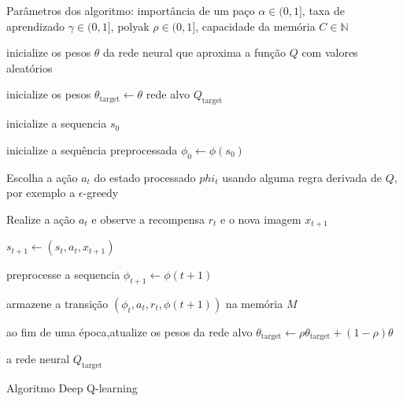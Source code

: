 \begin{algorithm}[H]
    Parâmetros dos algoritmo:
    importância de um paço $\alpha \in (0,1]$,
    taxa de aprendizado $\gamma \in (0,1]$,
    polyak $\rho \in (0,1]$,
    capacidade da memória $C \in \mathbb{N}$ 


    inicialize os pesos $\theta$ da rede neural que aproxima a função $Q$ com valores aleatórios

    inicialize os pesos $\theta_{\text{target}}  \leftarrow \theta$ rede alvo $Q_{\text{target}}$

     {
        inicialize a sequencia $s_0$

        inicialize a sequência preprocessada $\phi_0 \leftarrow \phi(s_0)$ 
        

         {
            Escolha a ação $a_t$ do estado processado $phi_t$ usando alguma regra derivada de $Q$,
            por exemplo a $\epsilon$-greedy

            Realize a ação $a_t$ e observe a recompensa $r_t$ e o nova imagem $x_{t+1}$
            
            $s_{t+1}  \leftarrow (s_t, a_t, x_{t+1})$   

            preprocesse a sequencia $\phi_{t+1} \leftarrow \phi(t+1)$
            
            armazene a transição $(\phi_t,a_t,r_t,\phi(t+1))$ na memória $M$



        }

        ao fim de uma época,atualize os pesos da rede alvo
        $\theta_{\text{target}}  \leftarrow \rho \theta_{\text{target}}  + (1-\rho) \theta$
        
    }
    \Retorna a rede neural $Q_{\text{target}}$
    \caption{Algoritmo Deep Q-learning}
    \label{Deep:Q-learning:}
\end{algorithm}

